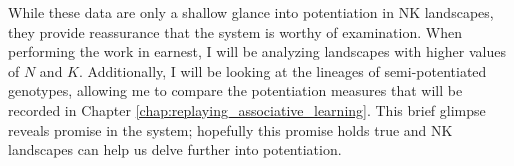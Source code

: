 While these data are only a shallow glance into potentiation in NK landscapes, they provide reassurance that the system is worthy of examination. %
When performing the work in earnest, I will be analyzing landscapes with higher values of $N$ and $K$. %
Additionally, I will be looking at the lineages of semi-potentiated genotypes, allowing me to compare the potentiation measures that will be recorded in Chapter \ref{chap:replaying_associative_learning}. 
This brief glimpse reveals promise in the system; hopefully this promise holds true and NK landscapes can help us delve further into potentiation. 